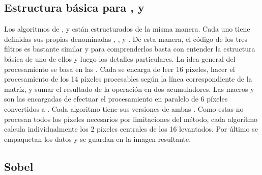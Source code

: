 \vspace{1cm}

\subsection{Estructura básica para ,  y }
	Los algoritmos de ,  y  están estructurados de la misma manera. Cada uno tiene 
definidas sus propias  denominadas , ,  y . 
De esta manera, el código de los tres filtros es bastante similar y para comprenderlos basta con entender la estructura básica de uno de 
ellos y luego los detalles particulares. La idea general del procesamiento se basa en las  . Cada 
 se encarga de leer 16 píxeles, hacer el procesamiento de los 14 píxeles procesables según la línea correspondiente de la 
matríz, y sumar el resultado de la operación en dos acumuladores. Las macros  y  son las encargadas de 
efectuar el procesamiento en paralelo de 6 píxeles convertidos a . Cada algoritmo tiene sus versiones de ambas .
 Como estas  no procesan todos los píxeles necesarios por limitaciones del método, cada algoritmo calcula individualmente 
los 2 píxeles centrales de los 16 levantados. Por último se empaquetan los datos y se guardan en la imagen resultante. 

\subsection{Sobel}

